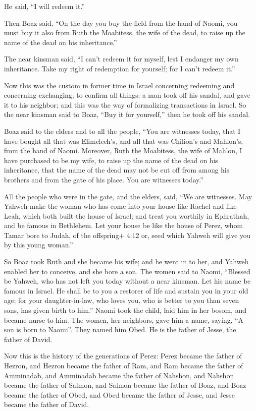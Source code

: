 He said, ``I will redeem it.''

 Then Boaz said, ``On the day you buy the field from the
hand of Naomi, you must buy it also from Ruth the Moabitess, the wife of
the dead, to raise up the name of the dead on his inheritance.''

 The near kinsman said, ``I can't redeem it for myself, lest
I endanger my own inheritance. Take my right of redemption for yourself;
for I can't redeem it.''

 Now this was the custom in former time in Israel concerning
redeeming and concerning exchanging, to confirm all things: a man took
off his sandal, and gave it to his neighbor; and this was the way of
formalizing transactions in Israel.  So the near kinsman
said to Boaz, ``Buy it for yourself,'' then he took off his sandal.

 Boaz said to the elders and to all the people, ``You are
witnesses today, that I have bought all that was Elimelech's, and all
that was Chilion's and Mahlon's, from the hand of Naomi. 
Moreover, Ruth the Moabitess, the wife of Mahlon, I have purchased to be
my wife, to raise up the name of the dead on his inheritance, that the
name of the dead may not be cut off from among his brothers and from the
gate of his place. You are witnesses today.''

 All the people who were in the gate, and the elders, said,
``We are witnesses. May Yahweh make the woman who has come into your
house like Rachel and like Leah, which both built the house of Israel;
and treat you worthily in Ephrathah, and be famous in Bethlehem.
 Let your house be like the house of Perez, whom Tamar bore
to Judah, of the offspring+ 4:12 or, seed which Yahweh will give you by
this young woman.''

 So Boaz took Ruth and she became his wife; and he went in
to her, and Yahweh enabled her to conceive, and she bore a son.
 The women said to Naomi, ``Blessed be Yahweh, who has not
left you today without a near kinsman. Let his name be famous in Israel.
 He shall be to you a restorer of life and sustain you in
your old age; for your daughter-in-law, who loves you, who is better to
you than seven sons, has given birth to him.''  Naomi took
the child, laid him in her bosom, and became nurse to him. 
The women, her neighbors, gave him a name, saying, ``A son is born to
Naomi''. They named him Obed. He is the father of Jesse, the father of
David.

 Now this is the history of the generations of Perez: Perez
became the father of Hezron,  and Hezron became the father
of Ram, and Ram became the father of Amminadab,  and
Amminadab became the father of Nahshon, and Nahshon became the father of
Salmon,  and Salmon became the father of Boaz, and Boaz
became the father of Obed,  and Obed became the father of
Jesse, and Jesse became the father of David.
